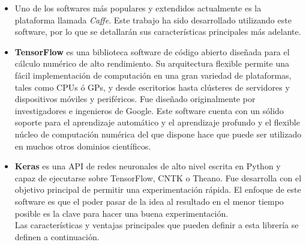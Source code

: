 \documentclass[a4paper, 12pt, oneside]{book}
\begin{document}
\begin{itemize}
\item Uno de los softwares más populares y extendidos actualmente es la plataforma llamada \textit{Caffe}. Este trabajo ha sido desarrollado utilizando este software, por lo que se detallarán sus características principales más adelante.
\item \textbf{TensorFlow} es una biblioteca software de código abierto diseñada para el cálculo numérico de alto rendimiento. Su arquitectura flexible permite una fácil implementación de computación en una gran variedad de plataformas, tales como CPUs ó GPs, y desde escritorios hasta clústeres de servidores y dispositivos móviles y periféricos. Fue diseñado originalmente por investigadores e ingenieros de Google. Este software cuenta con un sólido soporte para el aprendizaje automático y el aprendizaje profundo y el flexible núcleo de computación numérica del que dispone hace que puede ser utilizado en muchos otros dominios científicos.

\item \textbf{Keras} es una API de redes neuronales de alto nivel escrita en Python y capaz de ejecutarse sobre TensorFlow, CNTK o Theano. Fue desarrolla con el objetivo principal de permitir una experimentación rápida. El enfoque de este software es que el poder pasar de la idea al resultado en el menor tiempo posible es la clave para hacer una buena experimentación.\\

Las características y ventajas principales que pueden definir a esta librería se definen a continuación.


\end{itemize}
\end{document}
